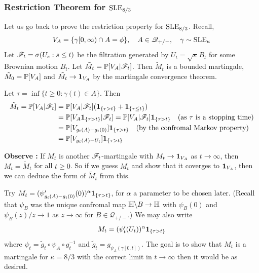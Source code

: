\documentclass[12pt,a4paper]{article}
\begin{document}
\subsubsection*{Restriction Theorem for $\text{SLE}_{8/3}$}

Let us go back to prove the restriction property for $\text{SLE}_{8/3}$. Recall, 
\begin{align*}
V_A = \{\gamma[0, \infty) \cap A =\phi \}, \quad A\in \mathscr{Q}_{+/-}, \quad \gamma \sim \text{SLE}_{\kappa}
\end{align*}
Let $\mathscr{F}_t = \sigma(U_s : s\leq t)$ be the filtration generated by $U_t = \sqrt{\kappa}B_t$ for some Brownian motion $B_t$. Let $\tilde{M}_t = \mathbb{P}[V_A | \mathscr{F}_t]$. Then $\tilde{M}_t$ is a bounded martingale, $\tilde{M}_0 =\mathbb{P}[V_A]$ and $\tilde{M_t} \rightarrow \bm{1}_{V_A}$ by the martingale convergence theorem.

\quad Let $\tau = \inf\{t\geq 0 : \gamma(t) \in A \}$. Then
\begin{align*}
\tilde{M}_t = \mathbb{P} [V_A |\mathscr{F}_t] &= \mathbb{P}[V_A | \mathscr{F}_t] (\bm{1}_{\{\tau >t\}} + \bm{1}_{\{\tau \leq t\}}) \\
& = \mathbb{P} [V_A \bm{1}_{\{\tau >t \}} |\mathscr{F}_t] = \mathbb{P}[V_A | \mathscr{F}_t] \bm{1}_{\{\tau >t \}} \quad \text{(as } \tau \text{ is a stopping time}) \\
& =\mathbb{P} [V_{g_t(A) - g_t(0)}]\bm{1}_{\{\tau >t\}} \quad \text{(by the confromal Markov property)} \\
& =\mathbb{P} [V_{g_t(A) - U_t}]\bm{1}_{\{\tau >t\}}
\end{align*} 

\textbf{Observe :} If $M_t$ is another $\mathscr{F}_t$-martingale with $M_t \rightarrow \bm{1}_{V_A}$ as $t\rightarrow \infty$, then $M_t = \tilde{M}_t$ for all $t\geq 0$. So if we guess $M_t$ and show that it coverges to $\bm{1}_{V_A}$, then we can deduce the form of $\tilde{M}_t$ from this.

\quad Try $M_t =(\psi'_{g_t(A)- g_t(0)}(0))^{\alpha}\bm{1}_{\{\tau >t\}}$, for $\alpha$ a parameter to be chosen later. (Recall that $\psi_B$ was the unique confromal map $\mathbb{H} \backslash B \rightarrow \mathbb{H}$ with $\psi_B(0)$ and $\psi_B(z) /z \rightarrow 1$ as $z\rightarrow \infty$ for $B\in \mathscr{Q}_{+/-}$.) We may also write
\begin{align*}
M_t = (\psi_t'(U_t))^{\alpha} \bm{1}_{\{\tau >t\}}
\end{align*}
where $\psi_t = \tilde{g}_t \circ \psi_A \circ g_t^{-1}$ and $\tilde{g}_t = g_{\psi_A(\gamma[0, t])}$. The goal is to show that $M_t$ is a martingale for $\kappa = 8/3$ with the correct limit in $t\rightarrow\infty$ then it would be as desired.
\s
\end{document}
